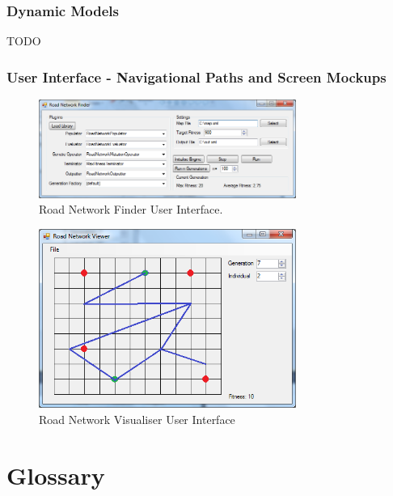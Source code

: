 \subsubsection{Dynamic Models}
TODO

\subsubsection{User Interface - Navigational Paths and Screen Mockups}
\begin{figure}[ht!]
 \caption{Road Network Finder User Interface.}
 \centering
 \includegraphics[width=0.75\textwidth]{../Finder.png}
\end{figure}

\begin{figure}[ht!]
 \caption{Road Network Visualiser User Interface}
 \centering
 \includegraphics[width=0.75\textwidth]{../Visualiser.png}
\end{figure}

\clearpage

\section{Glossary}


